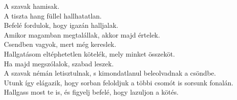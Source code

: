 \begin{Verse}
A szavak hamisak.						\\
A tiszta hang füllel hallhatatlan.				\\
Befelé fordulok, hogy igazán halljalak.				\\
Amikor magamban megtalállak, akkor majd értelek.		\\
Csendben vagyok, mert még kereslek.				\\
Hallgatásom eltéphetetlen kötelék, mely minket összeköt.	\\
Ha majd megszólalok, szabad leszek.				\\
A szavak némán letisztulnak, s kimondatlanul beleolvadnak a csöndbe. \\
Utunk így elágazik, hogy sorban feloldjuk a többi csomót is sorsunk fonalán. \\
Hallgass most te is, és figyelj befelé, hogy lazuljon a kötés.
\end{Verse}
